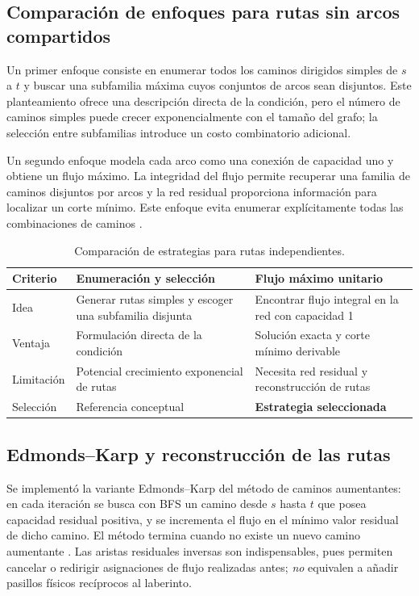 \documentclass[11pt,a4paper]{article}
\begin{document}
\subsection{Comparación de enfoques para rutas sin arcos compartidos}
Un primer enfoque consiste en enumerar todos los caminos dirigidos simples de $s$ a $t$ y buscar una subfamilia máxima cuyos conjuntos de arcos sean disjuntos. Este planteamiento ofrece una descripción directa de la condición, pero el número de caminos simples puede crecer exponencialmente con el tamaño del grafo; la selección entre subfamilias introduce un costo combinatorio adicional.

Un segundo enfoque modela cada arco como una conexión de capacidad uno y obtiene un flujo máximo. La integridad del flujo permite recuperar una familia de caminos disjuntos por arcos y la red residual proporciona información para localizar un corte mínimo. Este enfoque evita enumerar explícitamente todas las combinaciones de caminos \cite{ford1956,edmonds1972,kleinberg2006}.

\begin{table}[H]
\centering
\caption{Comparación de estrategias para rutas independientes.}
\begin{tabularx}{\textwidth}{>{\raggedright\arraybackslash}p{2.8cm}XX}
\toprule
Criterio & Enumeración y selección & Flujo máximo unitario \\
\midrule
Idea & Generar rutas simples y escoger una subfamilia disjunta & Encontrar flujo integral en la red con capacidad 1 \\
Ventaja & Formulación directa de la condición & Solución exacta y corte mínimo derivable \\
Limitación & Potencial crecimiento exponencial de rutas & Necesita red residual y reconstrucción de rutas \\
Selección & Referencia conceptual & \textbf{Estrategia seleccionada} \\
\bottomrule
\end{tabularx}
\end{table}

\subsection{Edmonds--Karp y reconstrucción de las rutas}
Se implementó la variante Edmonds--Karp del método de caminos aumentantes: en cada iteración se busca con BFS un camino desde $s$ hasta $t$ que posea capacidad residual positiva, y se incrementa el flujo en el mínimo valor residual de dicho camino. El método termina cuando no existe un nuevo camino aumentante \cite{edmonds1972}. Las aristas residuales inversas son indispensables, pues permiten cancelar o redirigir asignaciones de flujo realizadas antes; \emph{no} equivalen a añadir pasillos físicos recíprocos al laberinto.
\end{document}
